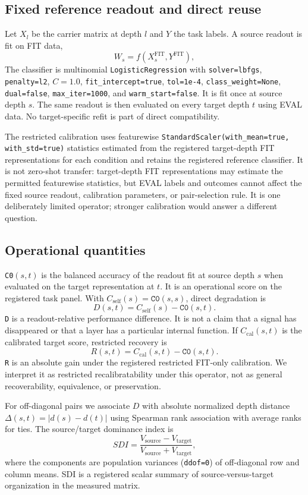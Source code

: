 \documentclass{article}
\begin{document}
\subsection{Fixed reference readout and direct reuse}
Let $X_l$ be the carrier matrix at depth $l$ and $Y$ the task labels. A source readout is fit on FIT data,
\[
 W_s=f(X_s^{\mathrm{FIT}},Y^{\mathrm{FIT}}),
\]
The classifier is multinomial \texttt{LogisticRegression} with \texttt{solver=lbfgs}, \texttt{penalty=l2}, $C=1.0$, \texttt{fit\_intercept=true}, \texttt{tol=1e-4}, \texttt{class\_weight=None}, \texttt{dual=false}, \texttt{max\_iter=1000}, and \texttt{warm\_start=false}. It is fit once at source depth $s$. The same readout is then evaluated on every target depth $t$ using EVAL data. No target-specific refit is part of direct compatibility.

The restricted calibration uses featurewise \texttt{StandardScaler(with\_mean=true, with\_std=true)} statistics estimated from the registered target-depth FIT representations for each condition and retains the registered reference classifier. It is not zero-shot transfer: target-depth FIT representations may estimate the permitted featurewise statistics, but EVAL labels and outcomes cannot affect the fixed source readout, calibration parameters, or pair-selection rule. It is one deliberately limited operator; stronger calibration would answer a different question.

\subsection{Operational quantities}
\texttt{C0}$(s,t)$ is the balanced accuracy of the readout fit at source depth $s$ when evaluated on the target representation at $t$. It is an operational score on the registered task panel. With $C_{\mathrm{self}}(s)=\texttt{C0}(s,s)$, direct degradation is
\[
D(s,t)=C_{\mathrm{self}}(s)-\texttt{C0}(s,t).
\]
\texttt{D} is a readout-relative performance difference. It is not a claim that a signal has disappeared or that a layer has a particular internal function. If $C_{\mathrm{cal}}(s,t)$ is the calibrated target score, restricted recovery is
\[
R(s,t)=C_{\mathrm{cal}}(s,t)-\texttt{C0}(s,t).
\]
\texttt{R} is an absolute gain under the registered restricted FIT-only calibration. We interpret it as restricted recalibratability under this operator, not as general recoverability, equivalence, or preservation.

For off-diagonal pairs we associate $D$ with absolute normalized depth distance $\Delta(s,t)=|d(s)-d(t)|$ using Spearman rank association with average ranks for ties. The source/target dominance index is
\[
 SDI=\frac{V_{\mathrm{source}}-V_{\mathrm{target}}}{V_{\mathrm{source}}+V_{\mathrm{target}}},
\]
where the components are population variances (\texttt{ddof=0}) of off-diagonal row and column means. SDI is a registered scalar summary of source-versus-target organization in the measured matrix.
\end{document}

